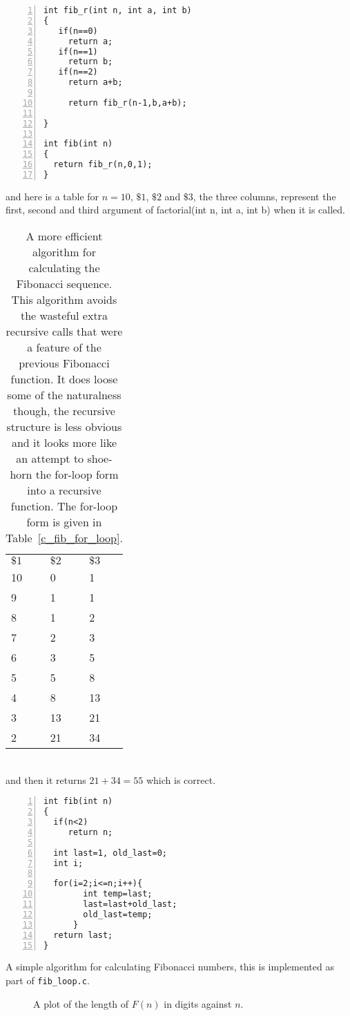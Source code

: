 \documentclass[11pt,a4paper]{scrartcl}
\begin{document}
\begin{table}
\begin{lstlisting}[numbers=left]
int fib_r(int n, int a, int b)
{
   if(n==0)
     return a;
   if(n==1)
     return b;
   if(n==2)
     return a+b;
     
     return fib_r(n-1,b,a+b);

}

int fib(int n)
{
  return fib_r(n,0,1);
}
\end{lstlisting}
and here is a table for $n=10$, $\$1$, $\$2$ and $\$3$, the three
columns, represent the first, second and third argument of
factorial(int n, int a, int b) when it is called.\\
\begin{tabular}{l|ll}
$\$1$&$\$2$&$\$3$\\
10&0&1\\
9 &1&1\\
8 &1&2\\
7 &2&3\\
6 &3&5\\
5 &5&8\\
4 &8&13\\
3 &13&21\\
2 &21&34\\
\end{tabular}\\
and then it returns $21+34=55$ which is correct.
\caption{A more efficient algorithm for calculating the Fibonacci
  sequence. This algorithm avoids the wasteful extra recursive calls
  that were a feature of the previous Fibonacci function. It does
  loose some of the naturalness though, the recursive structure is
  less obvious and it looks more like an attempt to shoe-horn the
  for-loop form into a recursive function. The for-loop form is given
  in Table~\ref{c_fib_for_loop}. \label{c_fib_good_recursion}}
\end{table}


\begin{table}
\begin{lstlisting}[numbers=left]
int fib(int n)
{
  if(n<2)
     return n;
  
  int last=1, old_last=0;
  int i;

  for(i=2;i<=n;i++){
        int temp=last;
        last=last+old_last;
        old_last=temp;
      }
  return last;
}
\end{lstlisting}

\caption{A simple algorithm for calculating Fibonacci numbers, this is implemented as part of {\tt fib\_loop.c}. \label{c_fib_for_loop}}
\end{table}


\begin{figure}

\caption{A plot of the length of $F(n)$ in digits against $n$. \label{fig_fib_length}}
\end{figure}
\end{document}
